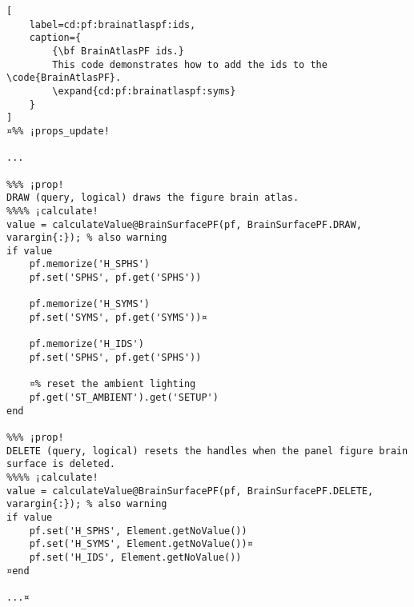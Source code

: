 \documentclass{tufte-handout}
\begin{document}
\begin{lstlisting}[
	label=cd:pf:brainatlaspf:ids,
	caption={
		{\bf BrainAtlasPF ids.}
		This code demonstrates how to add the ids to the \code{BrainAtlasPF}.
		\expand{cd:pf:brainatlaspf:syms}
	}
]
¤%% ¡props_update!

...

%%% ¡prop!
DRAW (query, logical) draws the figure brain atlas.
%%%% ¡calculate!
value = calculateValue@BrainSurfacePF(pf, BrainSurfacePF.DRAW, varargin{:}); % also warning
if value
    pf.memorize('H_SPHS')
    pf.set('SPHS', pf.get('SPHS'))

    pf.memorize('H_SYMS')
    pf.set('SYMS', pf.get('SYMS'))¤

    pf.memorize('H_IDS')
    pf.set('SPHS', pf.get('SPHS'))

    ¤% reset the ambient lighting
    pf.get('ST_AMBIENT').get('SETUP')
end

%%% ¡prop!
DELETE (query, logical) resets the handles when the panel figure brain surface is deleted.
%%%% ¡calculate!
value = calculateValue@BrainSurfacePF(pf, BrainSurfacePF.DELETE, varargin{:}); % also warning
if value
    pf.set('H_SPHS', Element.getNoValue())
    pf.set('H_SYMS', Element.getNoValue())¤
    pf.set('H_IDS', Element.getNoValue())
¤end

...¤
\end{lstlisting}
\end{document}
